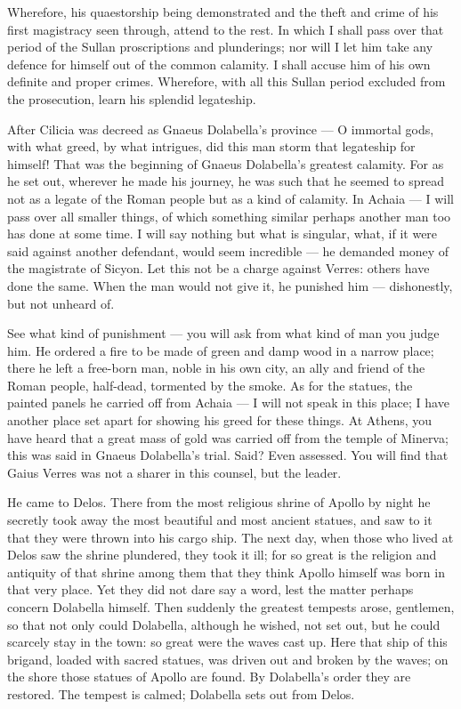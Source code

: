  Wherefore, his quaestorship being demonstrated and the theft and crime of his first magistracy seen through, attend to the rest. In which I shall pass over that period of the Sullan proscriptions and plunderings; nor will I let him take any defence for himself out of the common calamity. I shall accuse him of his own definite and proper crimes. Wherefore, with all this Sullan period excluded from the prosecution, learn his splendid legateship.

 After Cilicia was decreed as Gnaeus Dolabella's province --- O immortal gods, with what greed, by what intrigues, did this man storm that legateship for himself! That was the beginning of Gnaeus Dolabella's greatest calamity. For as he set out, wherever he made his journey, he was such that he seemed to spread not as a legate of the Roman people but as a kind of calamity. In Achaia --- I will pass over all smaller things, of which something similar perhaps another man too has done at some time. I will say nothing but what is singular, what, if it were said against another defendant, would seem incredible --- he demanded money of the magistrate of Sicyon. Let this not be a charge against Verres: others have done the same. When the man would not give it, he punished him --- dishonestly, but not unheard of.

 See what kind of punishment --- you will ask from what kind of man you judge him. He ordered a fire to be made of green and damp wood in a narrow place; there he left a free-born man, noble in his own city, an ally and friend of the Roman people, half-dead, tormented by the smoke. As for the statues, the painted panels he carried off from Achaia --- I will not speak in this place; I have another place set apart for showing his greed for these things. At Athens, you have heard that a great mass of gold was carried off from the temple of Minerva; this was said in Gnaeus Dolabella's trial. Said? Even assessed. You will find that Gaius Verres was not a sharer in this counsel, but the leader.

 He came to Delos. There from the most religious shrine of Apollo by night he secretly took away the most beautiful and most ancient statues, and saw to it that they were thrown into his cargo ship. The next day, when those who lived at Delos saw the shrine plundered, they took it ill; for so great is the religion and antiquity of that shrine among them that they think Apollo himself was born in that very place. Yet they did not dare say a word, lest the matter perhaps concern Dolabella himself. Then suddenly the greatest tempests arose, gentlemen, so that not only could Dolabella, although he wished, not set out, but he could scarcely stay in the town: so great were the waves cast up. Here that ship of this brigand, loaded with sacred statues, was driven out and broken by the waves; on the shore those statues of Apollo are found. By Dolabella's order they are restored. The tempest is calmed; Dolabella sets out from Delos.


